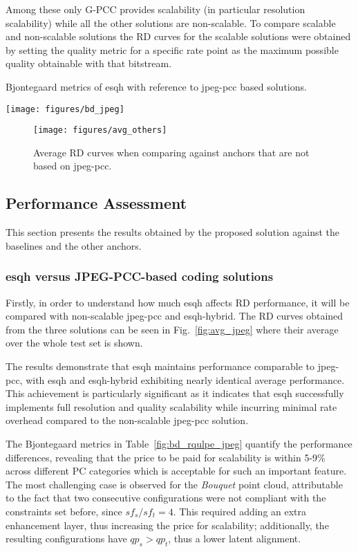  
Among these only G-PCC provides scalability (in particular resolution scalability) while all the other solutions are non-scalable.
To compare scalable and non-scalable solutions the RD curves for the scalable solutions were obtained by setting the quality metric for a specific rate point as the maximum possible quality obtainable with that bitstream.

\begin{table*}
    \centering
    \caption{Bjontegaard metrics of \gls{esqh} with reference to \gls{jpeg-pcc} based solutions.}
    \texttt{[image: figures/bd\_jpeg]}
    \label{fig:bd_rqulpe_jpeg}
\end{table*}
\begin{figure*}
    \centering
    \texttt{[image: figures/avg\_others]}    
    \caption{Average RD curves when comparing against anchors that are not based on \gls{jpeg-pcc}.}
    \label{fig:rd_rqulpe_others}
\end{figure*}

\subsection{Performance Assessment}
This section presents the results obtained by the proposed solution against the baselines and the other anchors.

\subsubsection{\gls{esqh} versus JPEG-PCC-based coding solutions}

Firstly, in order to understand how much \gls{esqh} affects RD performance, it will be compared with non-scalable \gls{jpeg-pcc} and 
\gls{esqh}-hybrid. The RD curves obtained from the three solutions can be seen in Fig.~\ref{fig:avg_jpeg}
where their average over the whole test set is shown.

The results demonstrate that \gls{esqh} maintains performance comparable to \gls{jpeg-pcc}, with \gls{esqh} and \gls{esqh}-hybrid exhibiting nearly identical average performance. 
This achievement is particularly significant as it indicates that \gls{esqh} successfully implements full resolution and quality scalability while incurring minimal rate overhead compared to the non-scalable \gls{jpeg-pcc} solution. 

The Bjontegaard metrics in Table~\ref{fig:bd_rqulpe_jpeg} quantify the performance differences, revealing that the price to be paid for scalability is within 5-9\% across different PC categories which is acceptable for such an important feature. The most challenging case is observed for the \textit{Bouquet} point cloud, attributable to the fact that two consecutive configurations were not compliant with the constraints set before, since $sf_s/sf_t = 4$. This required adding an extra enhancement layer, thus increasing the price for scalability; additionally, the resulting configurations have $qp_s > qp_t$, thus a lower latent alignment.

